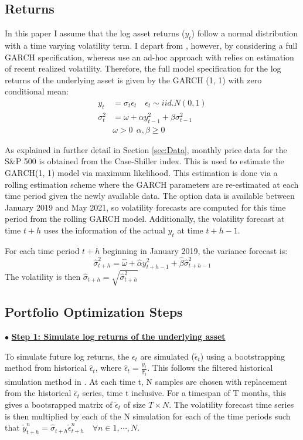 \subsection{Returns}\label{sec:GARCH}

In this paper I assume that the log asset returns ($y_{t}$) follow a normal distribution with a time varying volatility term. I depart from \cite{faias2017optimal}, however, by considering a full GARCH specification, whereas \cite{faias2017optimal} use an ad-hoc approach with relies on estimation of recent realized volatility. Therefore, the full model specification for the log returns of the underlying asset is given by the GARCH (1, 1) with zero conditional mean:
\noindent
\begin{align}
\nonumber y_{t} &= \sigma_{t} \epsilon_{t} \quad \epsilon_{t} \sim iid.N(0, 1)
\\ \nonumber \sigma_{t}^{2} &= \omega + \alpha y_{t - 1}^{2} + \beta \sigma_{t - 1}^{2}
\\ \nonumber & \omega > 0 \ \ \alpha, \beta \geq 0
\end{align}

As explained in further detail in Section \ref{sec:Data}, monthly price data for the S\&P 500 is obtained from the Case-Shiller index. This is used to estimate the GARCH(1, 1) model via maximum likelihood. This estimation is done via a rolling estimation scheme where the GARCH parameters are re-estimated at each time period given the newly available data. The option data is available between January 2019 and May 2021, so volatility forecasts are computed for this time period from the rolling GARCH model. Additionally, the volatility forecast at time $t + h$ uses the information of the actual $y_{t}$ at time $t + h - 1$.

For each time period $t + h$ beginning in January 2019, the variance forecast is:
\noindent
\[\hat{\sigma}_{t + h}^{2} = \hat{\omega} + \hat{\alpha} y_{t + h - 1}^{2} + \hat{\beta} \hat{\sigma}_{t + h - 1}^{2}\]
\noindent
The volatility is then $\hat{\sigma}_{t + h} = \sqrt{\hat{\sigma}_{t + h}^{2}}$

\subsection{Portfolio Optimization Steps}\label{sec:OptSteps}
$\bullet$ \underline{\textbf{Step 1: Simulate log returns of the underlying asset}}

To simulate future log returns, the $\epsilon_{t}$ are simulated ($\tilde{\epsilon}_{t}$) using a bootstrapping method from historical $\hat{\epsilon}_{t}$, where $\hat{\epsilon}_{t} = \frac{y_{t}}{\hat{\sigma}_{t}}$. This follows the filtered historical simulation method in \cite{barone2008garch}. At each time t, N samples are chosen with replacement from the historical $\hat{\epsilon}_{t}$ series, time t inclusive. For a timespan of T months, this gives a bootsrapped matrix of $\tilde{\epsilon}_{t}$ of size $T \times N$. The volatility forecast time series is then multiplied by each of the N simulation for each of the time periods such that $\tilde{y}_{t + h}^{n} = \hat{\sigma}_{t + h} \tilde{\epsilon}_{t + h}^{n} \quad \forall n \in 1, \dotsb, N$.

